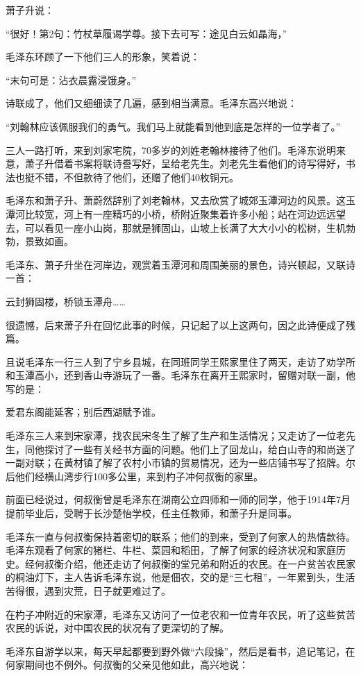 \documentclass[../../dazhuan.tex]{subfiles}
\begin{document}
萧子升说：

“很好！第2句：竹杖草履谒学尊。接下去可写：途见白云如晶海，”

毛泽东环顾了一下他们三人的形象，笑着说：

“末句可是：沾衣晨露浸饿身。”

诗联成了，他们又细细读了几遍，感到相当满意。毛泽东高兴地说：

“刘翰林应该佩服我们的勇气。我们马上就能看到他到底是怎样的一位学者了。”

三人一路打听，来到刘家宅院，70多岁的刘姓老翰林接待了他们。毛泽东说明来意，萧子升借着书案将联诗誊写好，呈给老先生。刘老先生看他们的诗写得好，书法也挺不错，不但款待了他们，还赠了他们40枚铜元。

毛泽东和萧子升、萧蔚然辞别了刘老翰林，又去欣赏了城郊玉潭河边的风景。这玉潭河比较宽，河上有一座精巧的小桥，桥附近聚集着许多小船；站在河边远远望去，可以看见一座小山岗，那就是狮固山，山坡上长满了大大小小的松树，生机勃勃，景致如画。

毛泽东、萧子升坐在河岸边，观赏着玉潭河和周围美丽的景色，诗兴顿起，又联诗一首：

云封狮固楼，桥锁玉潭舟……

很遗憾，后来萧子升在回忆此事的时候，只记起了以上这两句，因之此诗便成了残篇。

且说毛泽东一行三人到了宁乡县城，在同班同学王熙家里住了两天，走访了劝学所和玉潭高小，还到香山寺游玩了一番。毛泽东在离开王熙家时，留赠对联一副，他写的是：

爱君东阁能延客；别后西湖赋予谁。

毛泽东三人来到宋家潭，找农民宋冬生了解了生产和生活情况；又走访了一位老先生，同他探讨了一些有关经书方面的问题。他们上了回龙山，给白山寺的和尚送了一副对联；在黄材镇了解了农村小市镇的贸易情况，还为一些店铺书写了招牌。尔后他们经横山湾步行100多公里，来到杓子冲何叔衡的家里。

前面已经说过，何叔衡曾是毛泽东在湖南公立四师和一师的同学，他于1914年7月提前毕业后，受聘于长沙楚怡学校，任主任教师，和萧子升是同事。

毛泽东一直与何叔衡保持着密切的联系；他们的到来，受到了何家人的热情款待。毛泽东观看了何家的猪栏、牛栏、菜园和稻田，了解了何家的经济状况和家庭历史。经何叔衡介绍，他还走访了何叔衡的堂兄弟和附近的农民。在一户贫苦农民家的桐油灯下，主人告诉毛泽东说，他是佃农，交的是“三七租”，一年累到头，生活苦得很，遇到灾荒，日子就更难过了。

在杓子冲附近的宋家潭，毛泽东又访问了一位老农和一位青年农民，听了这些贫苦农民的诉说，对中国农民的状况有了更深切的了解。

毛泽东自游学以来，每天早起都要到野外做“六段操”，然后是看书，追记笔记，在何家期间也不例外。何叔衡的父亲见他如此，高兴地说：
\end{document}
